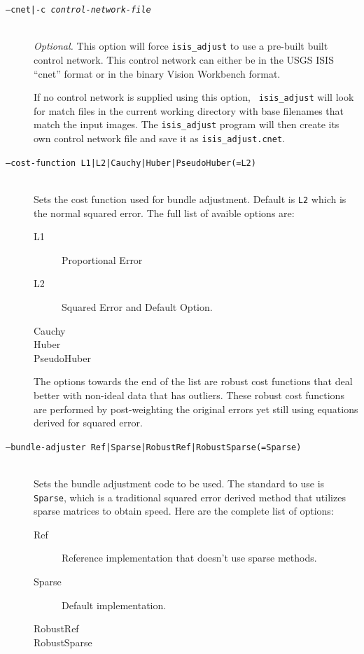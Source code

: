 \begin{description}

\item[\texttt{--cnet|-c \textit{control-network-file}}] \hfill \\
  \emph{Optional.} This option will force {\tt isis\_adjust} to
  use a pre-built built control network. This control network can
  either be in the \ac{USGS} \ac{ISIS} ``cnet'' format or in the binary Vision
  Workbench format.

  If no control network is supplied using this option, {\tt
    isis\_adjust} will look for match files in the current working
  directory with base filenames that match the input images.  The
  \texttt{isis\_adjust} program will then create its own control
  network file and save it as \texttt{isis\_adjust.cnet}.

\item[\texttt{--cost-function L1|L2|Cauchy|Huber|PseudoHuber(=L2)} ] \hfill \\
  Sets the cost function used for bundle adjustment. Default is \texttt{L2}
  which is the normal squared error. The full list of avaible options
  are:

  \begin{description}
    \item[L1] Proportional Error
    \item[L2] Squared Error and Default Option.
    \item[Cauchy]
    \item[Huber]
    \item[PseudoHuber]
  \end{description}

  The options towards the end of the list are robust cost functions
  that deal better with non-ideal data that has outliers. These robust
  cost functions are performed by post-weighting the original errors yet
  still using equations derived for squared error.

\item[\texttt{--bundle-adjuster Ref|Sparse|RobustRef|RobustSparse(=Sparse)}] \hfill \\
  Sets the bundle adjustment code to be used. The standard to use is
  \texttt{Sparse}, which is a traditional squared error derived method that
  utilizes sparse matrices to obtain speed. Here are the complete list
  of options:

  \begin{description}
    \item[Ref] Reference implementation that doesn't use sparse methods.
    \item[Sparse] Default implementation.
    \item[RobustRef]
    \item[RobustSparse]
  \end{description}


\end{description}
